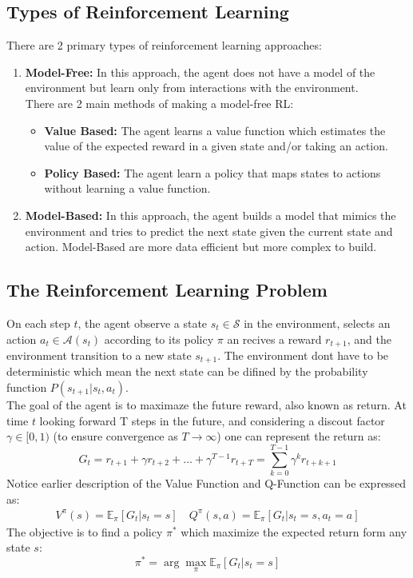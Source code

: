 \documentclass[12pt,a4paper]{report}
\begin{document}
\subsection{Types of Reinforcement Learning}
There are 2 primary types of reinforcement learning approaches:
\begin{enumerate}
    \item[] \textbf{Model-Free:} In this approach, the agent does not have a model of the environment but learn only from interactions with the environment.\\
    There are 2 main methods of making a model-free RL:
    \begin{itemize}
        \item \textbf{Value Based:} The agent learns a value function which estimates the value of the expected reward in a given state and/or taking an action.
        \item \textbf{Policy Based:} The agent learn a policy that maps states to actions without learning a value function. 
    \end{itemize}
    \item[] \textbf{Model-Based:} In this approach, the agent builds a model that mimics the environment and tries to predict the next state given the current state and action. Model-Based are more data efficient but more complex to build.
\end{enumerate}
\subsection{The Reinforcement Learning Problem}
On each step $t$, the agent observe a state $s_t\in\mathcal{S}$ in the environment, selects an action $a_t\in\mathcal{A}(s_t)$ according to its policy $\pi$ an recives a reward $r_{t+1}$, and the environment transition to a new state $s_{t+1}$. The environment dont have to be deterministic which mean the next state can be difined by the probability function $P(s_{t+1}|s_t,a_t)$.\\
The goal of the agent is to maximaze the future reward, also known as return. At time $t$ looking forward T steps in the future, and considering a discout factor $\gamma{\in}[0,1)$ (to ensure convergence as $T{\rightarrow}\infty$) one can represent the return as: $$G_t = r_{t+1} + {\gamma}r_{t+2}+\dots+{\gamma}^{T-1}r_{t+T}=\sum_{k=0}^{T-1}\gamma^{k}r_{t+k+1}$$
Notice earlier description of the Value Function and Q-Function can be expressed as: $$\begin{aligned}V^{\pi}(s)=\mathbb{E}_\pi[G_t|s_t=s] \quad Q^{\pi}(s,a)=\mathbb{E}_\pi[G_t|s_t=s, a_t=a]\end{aligned}$$
The objective is to find a policy $\pi^*$ which maximize the expected return form any state $s$: $${\pi}^*=\arg\max_{\pi}\mathbb{E}_\pi[G_t|s_t=s]$$
\end{document}
